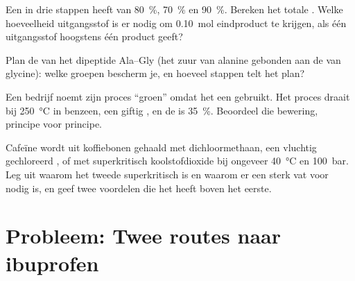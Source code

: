\begin{exercise}[$\star\star\star$]\label{exo:g12:synthesis-strategy:12}
Een  in drie stappen heeft  van \qty{80}{\percent},
\qty{70}{\percent} en \qty{90}{\percent}. Bereken het totale .
Welke hoeveelheid uitgangsstof is er nodig om \qty{0.10}{mol}
eindproduct te krijgen, als één  uitgangsstof hoogstens één 
product geeft?
\end{exercise}

\begin{exercise}[$\star\star\star$]\label{exo:g12:synthesis-strategy:13}
Plan de  van het dipeptide Ala--Gly (het zuur van alanine
gebonden aan de  van glycine): welke groepen bescherm je, en hoeveel
stappen telt het plan?
\end{exercise}

\begin{exercise}[$\star\star\star$]\label{exo:g12:synthesis-strategy:14}
Een bedrijf noemt zijn proces ``groen'' omdat het een 
gebruikt. Het proces draait bij \qty{250}{\celsius} in benzeen, een giftig
, en de  is \qty{35}{\percent}. Beoordeel die
bewering, principe voor principe.
\end{exercise}

\begin{exercise}[$\star\star\star$]\label{exo:g12:synthesis-strategy:15}
Cafeïne wordt uit koffiebonen gehaald met dichloormethaan, een vluchtig
gechloreerd , of met superkritisch koolstofdioxide bij
ongeveer \qty{40}{\celsius} en \qty{100}{bar}. Leg uit waarom het tweede
superkritisch is en waarom er een sterk vat voor nodig is, en geef twee
voordelen die het heeft boven het eerste.
\end{exercise}

\section{Probleem: Twee routes naar ibuprofen}

